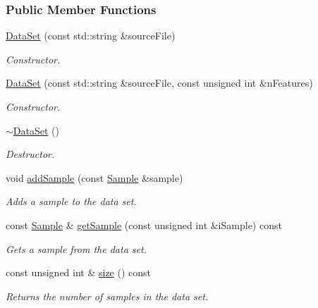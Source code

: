 \subsubsection*{Public Member Functions}
\begin{CompactItemize}
\item 
\hyperlink{class_data_set_1d2ca0edda13ea88e9962ea3c4cf1ed4}{DataSet} (const std::string \&sourceFile)
\begin{CompactList}\small\item\em Constructor. \item\end{CompactList}\item 
\hyperlink{class_data_set_ffb28bf240421998cd5470f594a6bb22}{DataSet} (const std::string \&sourceFile, const unsigned int \&nFeatures)
\begin{CompactList}\small\item\em Constructor. \item\end{CompactList}\item 
\hyperlink{class_data_set_2cdb84d32331956b413ca36933e516bd}{$\sim$DataSet} ()
\begin{CompactList}\small\item\em Destructor. \item\end{CompactList}\item 
void \hyperlink{class_data_set_73b646f0b40545eaf7bbe72418a0ed51}{addSample} (const \hyperlink{class_data_set_7563096ce4847d88411ed3f6ad331310}{Sample} \&sample)
\begin{CompactList}\small\item\em Adds a sample to the data set. \item\end{CompactList}\item 
const \hyperlink{class_data_set_7563096ce4847d88411ed3f6ad331310}{Sample} \& \hyperlink{class_data_set_839eb6985338d2c83ae987e75b2d0357}{getSample} (const unsigned int \&iSample) const 
\begin{CompactList}\small\item\em Gets a sample from the data set. \item\end{CompactList}\item 
const unsigned int \& \hyperlink{class_data_set_805d7628a3ee31a4d4278deba91c0bbf}{size} () const 
\begin{CompactList}\small\item\em Returns the number of samples in the data set. \item\end{CompactList}\item 

\end{CompactItemize}
